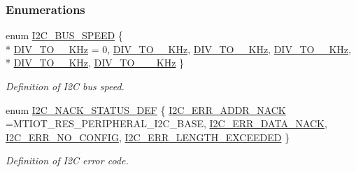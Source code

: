 \subsubsection*{Enumerations}
\begin{DoxyCompactItemize}
\item 
enum \hyperlink{group___i2_c_ga92ff849d9f99fb734695416e22ca1b97}{I2\+C\+\_\+\+B\+U\+S\+\_\+\+S\+P\+E\+ED} \{ \\*
\hyperlink{group___i2_c_gga92ff849d9f99fb734695416e22ca1b97abdff36ba6d04bee4a77001e9a66d50ae}{D\+I\+V\+\_\+\+T\+O\+\_\+\_\+\+K\+Hz} = 0, 
\hyperlink{group___i2_c_gga92ff849d9f99fb734695416e22ca1b97ac91b2d415f3f50b2e4559af21ccde3a0}{D\+I\+V\+\_\+\+T\+O\+\_\+\_\+\+K\+Hz}, 
\hyperlink{group___i2_c_gga92ff849d9f99fb734695416e22ca1b97a448bd277fdcd2c8e2e7e3d095cc47995}{D\+I\+V\+\_\+\+T\+O\+\_\+\_\+\+K\+Hz}, 
\hyperlink{group___i2_c_gga92ff849d9f99fb734695416e22ca1b97ae0e51c6aa1e307835e841dd7007e2d9c}{D\+I\+V\+\_\+\+T\+O\+\_\+\_\+\+K\+Hz}, 
\\*
\hyperlink{group___i2_c_gga92ff849d9f99fb734695416e22ca1b97ab28cedbac171374165ea93b986cbec45}{D\+I\+V\+\_\+\+T\+O\+\_\+\_\+\+K\+Hz}, 
\hyperlink{group___i2_c_gga92ff849d9f99fb734695416e22ca1b97ab8e01c09fd730f9762effc84e449b930}{D\+I\+V\+\_\+\+T\+O\+\_\+\_\+\_\+\+K\+Hz}
 \}\begin{DoxyCompactList}\small\item\em Definition of I2C bus speed. \end{DoxyCompactList}
\item 
enum \hyperlink{group___i2_c_ga1f6e0007f06d9712a8d57167530cc984}{I2\+C\+\_\+\+N\+A\+C\+K\+\_\+\+S\+T\+A\+T\+U\+S\+\_\+\+D\+EF} \{ \hyperlink{group___i2_c_gga1f6e0007f06d9712a8d57167530cc984abf3f27cbb9b0d3d1e946cd982dade735}{I2\+C\+\_\+\+E\+R\+R\+\_\+\+A\+D\+D\+R\+\_\+\+N\+A\+CK} =M\+T\+I\+O\+T\+\_\+\+R\+E\+S\+\_\+\+P\+E\+R\+I\+P\+H\+E\+R\+A\+L\+\_\+\+I2\+C\+\_\+\+B\+A\+SE, 
\hyperlink{group___i2_c_gga1f6e0007f06d9712a8d57167530cc984a33888d4daf24dc7226e29d514492c271}{I2\+C\+\_\+\+E\+R\+R\+\_\+\+D\+A\+T\+A\+\_\+\+N\+A\+CK}, 
\hyperlink{group___i2_c_gga1f6e0007f06d9712a8d57167530cc984afd3a4e5b2b2195efea25aec929ab29f0}{I2\+C\+\_\+\+E\+R\+R\+\_\+\+N\+O\+\_\+\+C\+O\+N\+F\+IG}, 
\hyperlink{group___i2_c_gga1f6e0007f06d9712a8d57167530cc984acaf0aa258bfadc9ea0d22497b7629a63}{I2\+C\+\_\+\+E\+R\+R\+\_\+\+L\+E\+N\+G\+T\+H\+\_\+\+E\+X\+C\+E\+E\+D\+ED}
 \}\begin{DoxyCompactList}\small\item\em Definition of I2C error code. \end{DoxyCompactList}
\end{DoxyCompactItemize}
